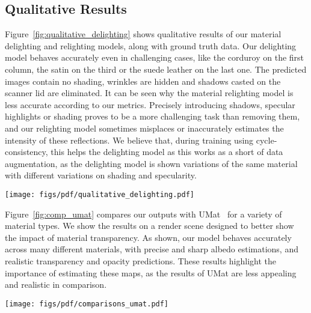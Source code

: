 \subsection{\textbf{Qualitative Results}}
\label{sec:results}

Figure~\ref{fig:qualitative_delighting} shows qualitative results of our material delighting and relighting models, along with ground truth data. Our delighting model behaves accurately even in challenging cases, like the corduroy on the first column, the satin on the third or the suede leather on the last one. The predicted images contain no shading, wrinkles are hidden and shadows casted on the scanner lid are eliminated. It can be seen why the material relighting model is less accurate according to our metrics. Precisely introducing shadows, specular highlights or shading proves to be a more challenging task than removing them, and our relighting model sometimes misplaces or inaccurately estimates the intensity of these reflections. We believe that, during training using cycle-consistency, this helps the delighting model as this works as a short of data augmentation, as the delighting model is shown variations of the same material with different variations on shading and specularity.

\begin{figure*}[tb!]
	\centering
	\texttt{[image: figs/pdf/qualitative\_delighting.pdf]}
	\caption{Qualitative results of our material delighting framework. On the first two rows, we show images captured with flatbed scanners under diffuse (top) and directional (bottom) illumination. We use those as input to our delighting $\mathcal{M}_D$ and relighting $\mathcal{M}_R$ models, respectively, for which we show the results on the bottom rows. }
	\label{fig:qualitative_delighting}
\end{figure*}


Figure~\ref{fig:comp_umat} compares our outputs with UMat~\cite{rodriguezpardo2023UMat} for a variety of material types. 
We show the results on a render scene designed to better show the impact of material transparency. As shown, our model behaves accurately across many different materials, with precise and sharp albedo estimations, and realistic transparency and opacity predictions. These results highlight the importance of estimating these maps, as the results of UMat are less appealing and realistic in comparison. 




\begin{figure*}[tb!]
	\centering
	\texttt{[image: figs/pdf/comparisons\_umat.pdf]}
	\caption{Qualitative comparisons of our method with UMat~\cite{rodriguezpardo2023UMat} for a few representative materials in our test set, with strong shading (leftmost columns), transparency (middle) or holes (rightmost). We show the input image (top row), and renders using the ground truth materials (captured with a gonioreflectometer), the estimation of~\cite{rodriguezpardo2023UMat} and ours, on the second, third and fourth rows, respectively. Best viewed in color on a screen.}
	\label{fig:comp_umat}
\end{figure*}


